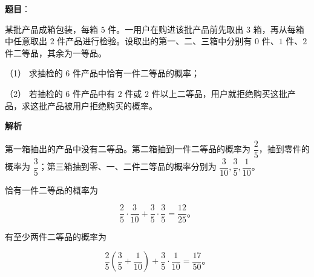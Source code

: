 \begin{answer}

\textbf{题目}：

某批产品成箱包装，每箱 $5$ 件。一用户在购进该批产品前先取出 $3$ 箱，再从每箱中任意取出 $2$ 件产品进行检验。设取出的第一、二、三箱中分别有 $0$ 件、$1$ 件、$2$ 件二等品，其余为一等品。

（1） 求抽检的 $6$ 件产品中恰有一件二等品的概率；

（2） 若抽检的 $6$ 件产品中有 $2$ 件或 $2$ 件以上二等品，用户就拒绝购买这批产品，求这批产品被用户拒绝购买的概率。

\textbf{解析}


第一箱抽出的产品中没有二等品。第二箱抽到一件二等品的概率为 $\dfrac25$，抽到零件的概率为 $\dfrac35$；第三箱抽到零、一、二件二等品的概率分别为 $\dfrac3{10},\dfrac35,\dfrac1{10}$。

恰有一件二等品的概率为

\nopagebreak[4]
\[
\frac25\cdot\frac3{10}+\frac35\cdot\frac35=\frac{12}{25}\text{。}
\]


有至少两件二等品的概率为

\nopagebreak[4]
\[
\frac25\left(\frac35+\frac1{10}\right)+\frac35\cdot\frac1{10}=\frac{17}{50}\text{。}
\]



\end{answer}
